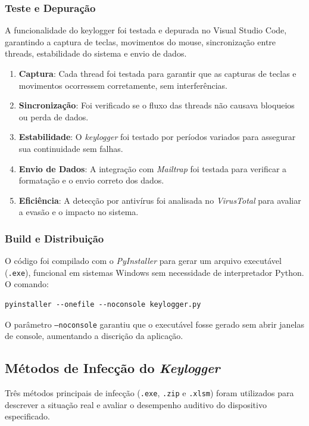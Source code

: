 \documentclass[12pt]{article}
\begin{document}
\subsubsection{Teste e Depuração}

A funcionalidade do keylogger foi testada e depurada no Visual Studio Code, garantindo a captura de teclas, movimentos do mouse, sincronização entre threads, estabilidade do sistema e envio de dados.

\begin{enumerate}
    \item \textbf{Captura}: Cada thread foi testada para garantir que as capturas de teclas e movimentos ocorressem corretamente, sem interferências.
    \item \textbf{Sincronização}: Foi verificado se o fluxo das threads não causava bloqueios ou perda de dados.
    \item \textbf{Estabilidade}: O \textit{keylogger} foi testado por períodos variados para assegurar sua continuidade sem falhas.
    \item \textbf{Envio de Dados}: A integração com \textit{Mailtrap} foi testada para verificar a formatação e o envio correto dos dados.
    \item \textbf{Eficiência}: A detecção por antivírus foi analisada no \textit{VirusTotal} para avaliar a evasão e o impacto no sistema.
\end{enumerate}

\subsubsection{Build e Distribuição}

O código foi compilado com o \textit{PyInstaller} para gerar um arquivo executável (\texttt{.exe}), funcional em sistemas Windows sem necessidade de interpretador Python. O comando:

\begin{verbatim} 
pyinstaller --onefile --noconsole keylogger.py 
\end{verbatim}

O parâmetro \texttt{--noconsole} garantiu que o executável fosse gerado sem abrir janelas de console, aumentando a discrição da aplicação.

\subsection{Métodos de Infecção do \textit{Keylogger}}
Três métodos principais de infecção (\texttt{.exe}, \texttt{.zip} e \texttt{.xlsm}) foram utilizados para descrever a situação real e avaliar o desempenho auditivo do dispositivo especificado.
\end{document}
